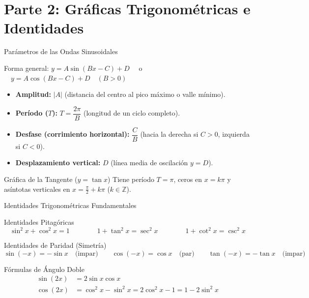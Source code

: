 \documentclass[aspectratio=169]{beamer}
\begin{document}
\section{Parte 2: Gráficas Trigonométricas e Identidades}


\begin{frame}{Parámetros de las Ondas Sinusoidales}
  \begin{block}{Forma general: $y = A \sin(Bx - C) + D \quad$ o $\quad y = A \cos(Bx - C) + D \quad (B > 0)$}
    \begin{itemize}
      \item \textbf{Amplitud:} $|A|$ (distancia del centro al pico máximo o valle mínimo).
      \item \textbf{Período ($T$):} $T = \dfrac{2\pi}{B}$ (longitud de un ciclo completo).
      \item \textbf{Desfase (corrimiento horizontal):} $\dfrac{C}{B}$ (hacia la derecha si $C > 0$, izquierda si $C < 0$).
      \item \textbf{Desplazamiento vertical:} $D$ (línea media de oscilación $y = D$).
    \end{itemize}
  \end{block}

  \vspace{4pt}
  \begin{block}{Gráfica de la Tangente ($y = \tan x$)}
    Tiene período $T = \pi$, ceros en $x = k\pi$ y asíntotas verticales en $x = \frac{\pi}{2} + k\pi$ ($k \in \mathbb{Z}$).
  \end{block}
\end{frame}

\begin{frame}{Identidades Trigonométricas Fundamentales}
  \begin{block}{Identidades Pitagóricas}
    $$\boxed{\sin^2 x + \cos^2 x = 1} \qquad\qquad \boxed{1 + \tan^2 x = \sec^2 x} \qquad\qquad \boxed{1 + \cot^2 x = \csc^2 x}$$
  \end{block}

  \vspace{4pt}
  \begin{block}{Identidades de Paridad (Simetría)}
    $$\sin(-x) = -\sin x \quad \text{(impar)} \qquad \cos(-x) = \cos x \quad \text{(par)} \qquad \tan(-x) = -\tan x \quad \text{(impar)}$$
  \end{block}

  \vspace{4pt}
  \begin{block}{Fórmulas de Ángulo Doble}
    \begin{align*}
      \sin(2x) &= 2\sin x \cos x \\
      \cos(2x) &= \cos^2 x - \sin^2 x = 2\cos^2 x - 1 = 1 - 2\sin^2 x
    \end{align*}
  \end{block}
\end{frame}
\end{document}
